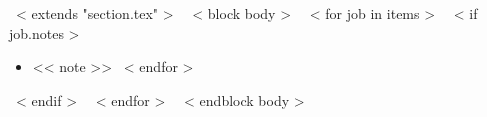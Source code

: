 ~< extends "section.tex" >~
~< block body >~
  ~< for job in items >~
    ~< if job.notes >~
      \begin{itemize}
        ~< for note in job.notes >~
          \item{<< note >>}
        ~< endfor >~
      \end{itemize}
    ~< endif >~
    \vspace{10pt}
  ~< endfor >~
  \vspace{-10pt}
~< endblock body >~
